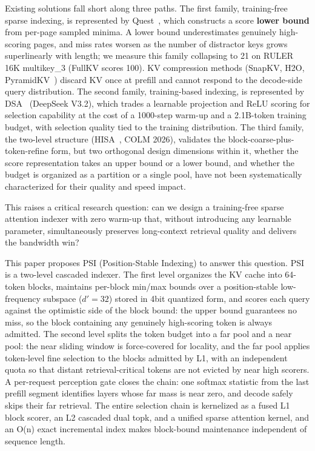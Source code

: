 \documentclass[11pt]{article}
\begin{document}
Existing solutions fall short along three paths. The first family, training-free sparse indexing, is represented by Quest~\cite{quest}, which constructs a score \textbf{lower bound} from per-page sampled minima. A lower bound underestimates genuinely high-scoring pages, and miss rates worsen as the number of distractor keys grows superlinearly with length; we measure this family collapsing to 21 on RULER 16K multikey\_3 (FullKV scores 100). KV compression methods (SnapKV, H2O, PyramidKV~\cite{snapkv,h2o,pyramidkv}) discard KV once at prefill and cannot respond to the decode-side query distribution. The second family, training-based indexing, is represented by DSA~\cite{dsa} (DeepSeek V3.2), which trades a learnable projection and ReLU scoring for selection capability at the cost of a 1000-step warm-up and a 2.1B-token training budget, with selection quality tied to the training distribution. The third family, the two-level structure (HISA~\cite{hisa}, COLM 2026), validates the block-coarse-plus-token-refine form, but two orthogonal design dimensions within it, whether the score representation takes an upper bound or a lower bound, and whether the budget is organized as a partition or a single pool, have not been systematically characterized for their quality and speed impact.

This raises a critical research question: can we design a training-free sparse attention indexer with zero warm-up that, without introducing any learnable parameter, simultaneously preserves long-context retrieval quality and delivers the bandwidth win?

This paper proposes PSI (Position-Stable Indexing) to answer this question. PSI is a two-level cascaded indexer. The first level organizes the KV cache into 64-token blocks, maintains per-block min/max bounds over a position-stable low-frequency subspace ($d'{=}32$) stored in 4bit quantized form, and scores each query against the optimistic side of the block bound: the upper bound guarantees no miss, so the block containing any genuinely high-scoring token is always admitted. The second level splits the token budget into a far pool and a near pool: the near sliding window is force-covered for locality, and the far pool applies token-level fine selection to the blocks admitted by L1, with an independent quota so that distant retrieval-critical tokens are not evicted by near high scorers. A per-request perception gate closes the chain: one softmax statistic from the last prefill segment identifies layers whose far mass is near zero, and decode safely skips their far retrieval. The entire selection chain is kernelized as a fused L1 block scorer, an L2 cascaded dual topk, and a unified sparse attention kernel, and an O(n) exact incremental index makes block-bound maintenance independent of sequence length.
\end{document}
